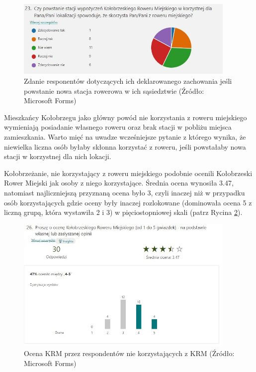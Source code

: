 \documentclass{amuthesis}
\begin{document}
\begin{figure}[t]

{\centering \includegraphics[width=400px]{figures/ankieta/23} 

}

\caption{Zdanie responentów dotyczących ich deklarowanego zachowania jeśli powstanie nowa stacja rowerowa w ich sąsiedztwie (Źródło: Microsoft Forms)}\label{fig:ankieta23}
\end{figure}

Mieszkańcy Kołobrzegu jako główny powód nie korzystania z roweru miejskiego wymieniają posiadanie własnego roweru oraz brak stacji w pobliżu miejsca zamieszkania.
Warto mięć na uwadze wcześniejsze pytanie z którego wynika, że niewielka liczna osób byłaby skłonna korzystać z roweru, jeśli powstałaby nowa stacji w korzystnej dla nich lokacji.

Kołobrzeżanie, nie korzystający z roweru miejskiego podobnie ocenili Kołobrzeski Rower Miejski jak osoby z niego korzystające.
Średnia ocena wynosiła 3.47, natomiast najliczniejszą przyznaną ocena było 3, czyli inaczej niż w przypadku osób korzystających gdzie oceny były inaczej rozlokowane (dominowała ocena 5 z liczną grupą, która wystawiła 2 i 3) w pięciostopniowej skali (patrz Rycina \ref{fig:ankieta26}).

\begin{figure}[t]

{\centering \includegraphics[width=400px]{figures/ankieta/26} 

}

\caption{Ocena KRM przez respondentów nie korzystających z KRM (Źródło: Microsoft Forms)}\label{fig:ankieta26}
\end{figure}
\end{document}
